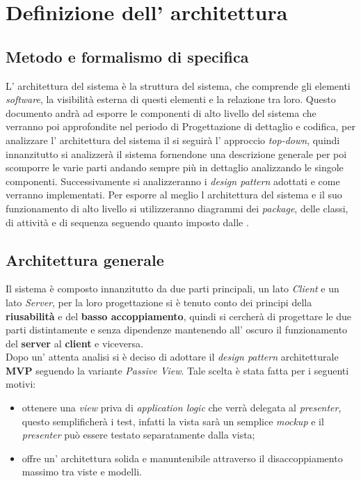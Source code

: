 \section{Definizione dell' architettura}
\subsection{Metodo e formalismo di specifica}
L' architettura del sistema è la struttura del sistema, che comprende gli elementi \textit{software}, la visibilità esterna di questi elementi e la relazione tra loro.
Questo documento andrà ad esporre le componenti di alto livello del sistema che verranno poi approfondite nel periodo di Progettazione di dettaglio e codifica, per analizzare l' architettura del sistema il \progetto si seguirà l' approccio \textit{top-down}, quindi innanzitutto si analizzerà il sistema fornendone una descrizione generale per poi scomporre le varie parti andando sempre più in dettaglio analizzando le singole componenti.
Successivamente si analizzeranno i \textit{design pattern} adottati e come verranno implementati.
Per esporre al meglio l architettura del sistema e il suo funzionamento di alto livello si utilizzeranno diagrammi dei \textit{package}, delle classi, di attività e di sequenza seguendo quanto imposto dalle \NormeDiProgetto{}.
\subsection{Architettura generale}
Il sistema \progetto{} è composto innanzitutto da due parti principali, un lato \textit{Client} e un lato \textit{Server}, per la loro progettazione si è tenuto conto dei principi della \textbf{riusabilità} e del \textbf{basso accoppiamento}, quindi si cercherà di progettare le due parti distintamente e senza dipendenze mantenendo all' oscuro il funzionamento del \textbf{server} al \textbf{client} e viceversa.\\
Dopo un' attenta analisi si è deciso di adottare il \textit{design pattern} architetturale \textbf{MVP} seguendo la variante \textit{Passive View}. Tale scelta è stata fatta per i seguenti motivi:
\begin{itemize}
	\item ottenere una \textit{view} priva di \textit{application logic} che verrà delegata al \textit{presenter}, questo semplificherà i test, infatti la vista sarà un semplice \textit{mockup} e il \textit{presenter} può essere testato separatamente dalla vista;
	\item offre un' architettura solida e manuntenibile attraverso il disaccoppiamento massimo tra viste e modelli.
\end{itemize}

